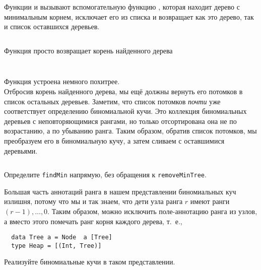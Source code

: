 \begin{frame}[fragile]{}
Функции  и  вызывают
вспомогательную функцию , которая находит
дерево с минимальным корнем, исключает его из списка и возвращает как
это дерево, так и список оставшихся деревьев.

\inputminted[firstline=28,lastline=32]{haskell}{code/BinomialHeap.lhs}

Функция  просто возвращает корень найденного дерева

\inputminted[firstline=40,lastline=41,gobble=2] {haskell}{code/BinomialHeap.lhs}
\inputminted[firstline=9,lastline=9] {haskell}{code/BinomialHeap.lhs}
\end{frame}

\begin{frame}[fragile]{}
Функция  устроена немного похитрее. \\

 Отбросив
корень найденного дерева, мы ещё должны вернуть его потомков в список
остальных деревьев. Заметим, что список потомков \emph{почти} уже
соответствует определению биномиальной кучи. Это коллекция
биномиальных деревьев с неповторяющимися рангами, но только
отсортирована она не по возрастанию, а по убыванию ранга. Таким
образом, обратив список потомков, мы преобразуем его в биномиальную
кучу, а затем сливаем с оставшимися деревьями.

\inputminted[firstline=43,lastline=44,gobble=2] {haskell}{code/BinomialHeap.lhs}
\end{frame}

\ifanswers
\begin{frame}[fragile]{}
\begin{exercise}\label{ex:3.5}
  Определите \lstinline!findMin! напрямую, без обращения к \lstinline!removeMinTree!.
\end{exercise}

\begin{exercise}\label{ex:3.6}
  Большая часть аннотаций ранга в нашем представлении биномиальных куч
  излишня, потому что мы и так знаем, что дети узла ранга $r$ имеют
  ранги $(r\!-\!1), \ldots, 0$. Таким образом, можно исключить
  поле-аннотацию ранга из узлов, а вместо этого помечать ранг корня
  каждого дерева, т.~е.,
  \begin{verbatim}
  data Tree a = Node  a [Tree]
  type Heap = [(Int, Tree)]
  \end{verbatim}
  Реализуйте биномиальные кучи в таком представлении.
\end{exercise}
\end{frame}

